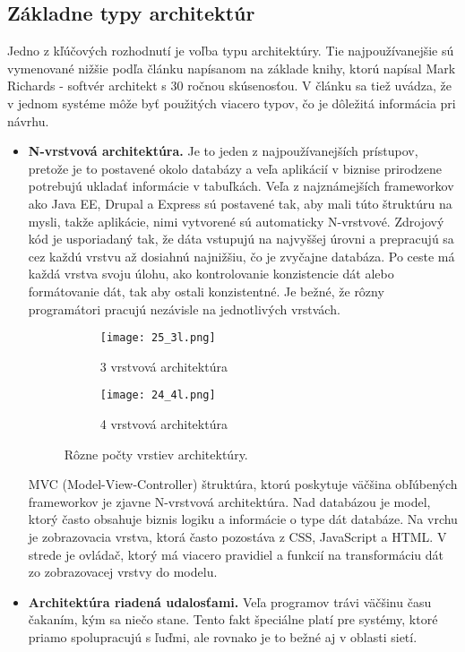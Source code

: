 \subsection{Základne typy architektúr}
Jedno z kľúčových rozhodnutí je voľba typu architektúry. Tie najpoužívanejšie sú vymenované nižšie podľa článku \cite{IOT05} napísanom na základe knihy\cite{IOT08}, ktorú napísal Mark Richards - softvér architekt s 30 ročnou skúsenosťou. V článku sa tiež uvádza, že v jednom systéme môže byť použitých viacero typov, čo je  dôležitá informácia pri návrhu.
\begin{itemize}
 \item \textbf{ N-vrstvová architektúra.} Je to jeden z najpoužívanejších prístupov, pretože je to postavené okolo databázy a veľa aplikácií v biznise prirodzene potrebujú ukladať informácie v tabuľkách. \indent Veľa z najznámejších frameworkov ako Java EE, Drupal a Express sú postavené tak, aby mali túto štruktúru na mysli, takže aplikácie, nimi vytvorené sú automaticky N-vrstvové.
\indent Zdrojový kód je usporiadaný tak, že dáta vstupujú na najvyššej úrovni a prepracujú sa cez každú vrstvu až dosiahnú najnižšiu, čo je zvyčajne databáza. Po ceste má každá vrstva svoju úlohu, ako kontrolovanie konzistencie dát alebo formátovanie dát, tak aby ostali konzistentné. Je bežné, že rôzny programátori pracujú nezávisle na jednotlivých vrstvách.
\begin{figure}[!htbp]
\centering
\begin{subfigure}{0.5\linewidth}
\texttt{[image: 25\_3l.png]}
\caption{3 vrstvová architektúra \cite{IOT07}}
\label{25_3l}
\end{subfigure}%
\begin{subfigure}{0.5\linewidth}
\texttt{[image: 24\_4l.png]}
\caption{4 vrstvová architektúra\cite{IOT06}}
\label{24_4l}
\end{subfigure}
\caption{Rôzne počty vrstiev architektúry.}
\end{figure}
MVC (Model-View-Controller) štruktúra, ktorú poskytuje väčšina obľúbených frameworkov je zjavne N-vrstvová architektúra. Nad databázou je model, ktorý často obsahuje biznis logiku a informácie o type dát databáze. Na vrchu je zobrazovacia vrstva, ktorá často pozostáva z CSS, JavaScript a HTML. V strede je ovládač, ktorý má viacero pravidiel a funkcií na transformáciu dát zo zobrazovacej vrstvy do modelu.
 \item \textbf{ Architektúra riadená udalosťami.} Veľa programov trávi väčšinu času čakaním, kým sa niečo stane. Tento fakt špeciálne platí pre systémy, ktoré priamo spolupracujú  s ľuďmi, ale rovnako je to bežné aj v oblasti sietí.

\end{itemize}

